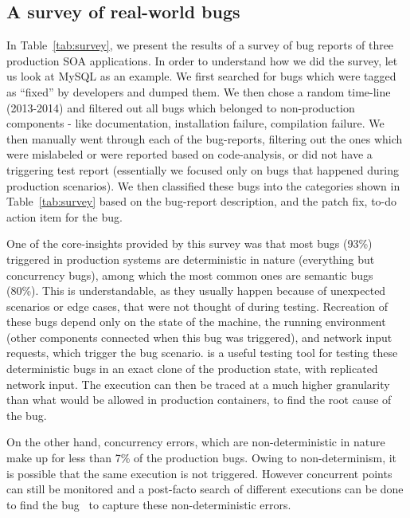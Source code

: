 \subsection{A survey of real-world bugs}
\label{sec:survey}
\noindent

In Table~\ref{tab:survey}, we present the results of a survey of bug reports of three production SOA applications.
In order to understand how we did the survey, let us look at MySQL as an example.
We first searched for bugs which were tagged as ``fixed'' by developers and dumped them.
We then chose a random time-line (2013-2014) and filtered out all bugs which belonged to non-production components - like documentation, installation failure, compilation failure.
We then manually went through each of the bug-reports, filtering out the ones which were mislabeled or were reported based on code-analysis, or did not have a triggering test report (essentially we focused only on bugs that happened during production scenarios).
We then classified these bugs into the categories shown in Table~\ref{tab:survey} based on the bug-report description, and the patch fix, to-do action item for the bug.

One of the core-insights provided by this survey was that most bugs (93\%) triggered in production systems are deterministic in nature (everything but concurrency bugs), among which the most common ones are semantic bugs (80\%).
This is understandable, as they usually happen because of unexpected scenarios or edge cases, that were not thought of during testing.
Recreation of these bugs depend only on the state of the machine, the running environment (other components connected when this bug was triggered), and network input requests, which trigger the bug scenario.
\parikshan is a useful testing tool for testing these deterministic bugs in an exact clone of the production state, with replicated network input. 
The execution can then be traced at a much higher granularity than what would be allowed in production containers, to find the root cause of the bug. 

On the other hand, concurrency errors, which are non-deterministic in nature make up for less than 7\% of the production bugs.
Owing to non-determinism, it is possible that the same execution is not triggered. However concurrent points can still be monitored and a post-facto search of different executions can be done to find the bug~\cite{dpor,systematicDPORconcurrency} to capture these non-deterministic errors.\\ \\


